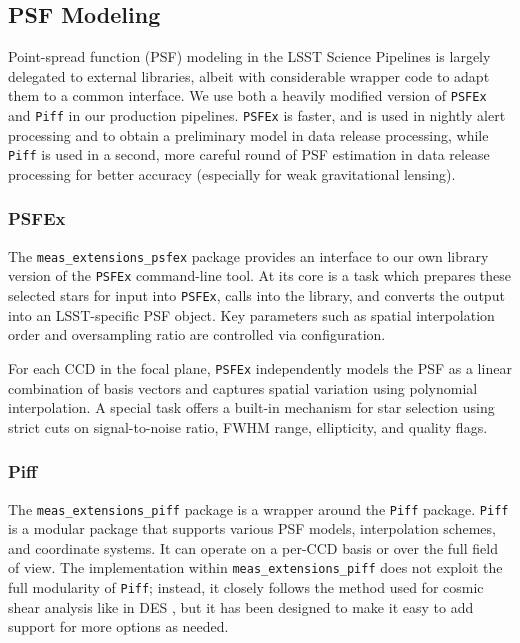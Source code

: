 \subsection{PSF Modeling}

\label{sec:psf_modeling}

Point-spread function (PSF) modeling in the LSST Science Pipelines is largely delegated to external libraries, albeit with considerable wrapper code to adapt them to a common interface.
We use both a heavily modified version of \texttt{PSFEx} \citep{2011ASPC..442..435B,2013ascl.soft01001B} and \texttt{Piff} \citep{2021ascl.soft02024J,2021MNRAS.501.1282J} in our production pipelines.
\texttt{PSFEx} is faster, and is used in nightly alert processing and to obtain a preliminary model in data release processing, while \texttt{Piff} is used in a second, more careful round of PSF estimation in data release processing for better accuracy (especially for weak gravitational lensing).

\subsubsection{PSFEx}\label{sec:meas_extensions_psfex}

The \texttt{meas\_extensions\_psfex} package provides an interface to our own library version of the \texttt{PSFEx} command-line tool.
At its core is a task which prepares these selected stars for input into \texttt{PSFEx}, calls into the library, and converts the output into an LSST-specific PSF object.
Key parameters such as spatial interpolation order and oversampling ratio are controlled via configuration.

For each CCD in the focal plane, \texttt{PSFEx} independently models the PSF as a linear combination of basis vectors and captures spatial variation using polynomial interpolation.
A special task offers a built-in mechanism for star selection using strict cuts on signal-to-noise ratio, FWHM range, ellipticity, and quality flags.

\subsubsection{Piff}
\label{sec:meas_extensions_piff}

The \texttt{meas\_extensions\_piff} package is a wrapper around the \texttt{Piff} package.
\texttt{Piff} is a modular package that supports various PSF models, interpolation schemes, and coordinate systems.
It can operate on a per-CCD basis or over the full field of view.
The implementation within  \texttt{meas\_extensions\_piff} does not exploit the full modularity of \texttt{Piff}; instead, it closely follows the method used for cosmic shear analysis like in DES \citep{2021MNRAS.501.1282J,2025OJAp....8E..26S}, but it has been designed to make it easy to add support for more options as needed.

